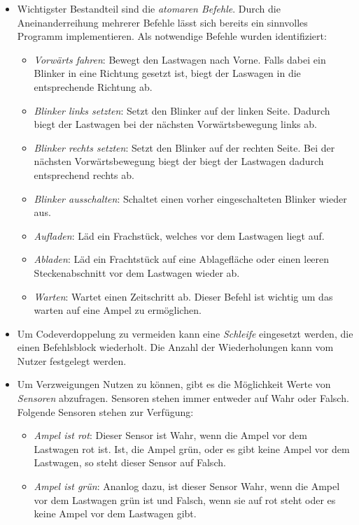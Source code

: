 \begin{itemize}
  \item Wichtigster Bestandteil sind die \emph{atomaren Befehle}. Durch die Aneinanderreihung mehrerer Befehle lässt sich bereits ein sinnvolles Programm implementieren. Als notwendige Befehle wurden identifiziert:
  \begin{itemize}
    \item \emph{Vorwärts fahren}: Bewegt den Lastwagen nach Vorne. Falls dabei ein Blinker in eine Richtung gesetzt ist, biegt der Laswagen in die entsprechende Richtung ab.
    \item \emph{Blinker links setzten}: Setzt den Blinker auf der linken Seite. Dadurch biegt der Lastwagen bei der nächsten Vorwärtsbewegung links ab.
    \item \emph{Blinker rechts setzten}: Setzt den Blinker auf der rechten Seite. Bei der nächsten Vorwärtsbewegung biegt der biegt der Lastwagen dadurch entsprechend rechts ab.
    \item \emph{Blinker ausschalten}: Schaltet einen vorher eingeschalteten Blinker wieder aus.
    \item \emph{Aufladen}: Läd ein Frachstück, welches vor dem Lastwagen liegt auf.
    \item \emph{Abladen}: Läd ein Frachtstück auf eine Ablagefläche oder einen leeren Steckenabschnitt vor dem Lastwagen wieder ab.
    \item \emph{Warten}: Wartet einen Zeitschritt ab. Dieser Befehl ist wichtig um das warten auf eine Ampel zu ermöglichen.
  \end{itemize}
  \item Um Codeverdoppelung zu vermeiden kann eine \emph{Schleife} eingesetzt werden, die einen Befehlsblock wiederholt. Die Anzahl der Wiederholungen kann vom Nutzer festgelegt werden.
  \item Um Verzweigungen Nutzen zu können, gibt es die Möglichkeit Werte von \emph{Sensoren} abzufragen. Sensoren stehen immer entweder auf Wahr oder Falsch. Folgende Sensoren stehen zur Verfügung:
  \begin{itemize}
    \item \emph{Ampel ist rot}: Dieser Sensor ist Wahr, wenn die Ampel vor dem Lastwagen rot ist. Ist, die Ampel grün, oder es gibt keine Ampel vor dem Lastwagen, so steht dieser Sensor auf Falsch.
    \item \emph{Ampel ist grün}: Ananlog dazu, ist dieser Sensor Wahr, wenn die Ampel vor dem Lastwagen grün ist und Falsch, wenn sie auf rot steht oder es keine Ampel vor dem Lastwagen gibt.

\end{itemize}
\end{itemize}
